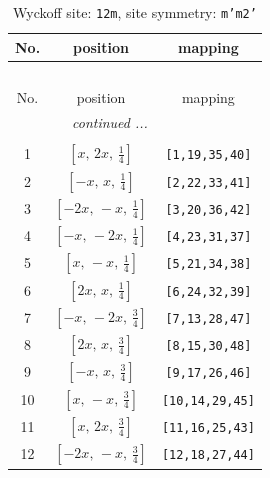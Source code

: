 \documentclass[fleqn,8pt]{jsarticle}
\begin{document}
\begin{longtable}{ccc}
\caption{Wyckoff site: {\tt 12m}, site symmetry: {\tt m'm2'}}
 \\
 \hline \hline
No. & position & mapping \\ \hline \endfirsthead

\multicolumn{2}{l}{\tablename\ \thetable{}} \\
 \hline \hline
No. & position & mapping \\ \hline \endhead

 \hline \hline
\multicolumn{2}{r}{\footnotesize\it continued ...} \\ \endfoot

 \hline \hline
\multicolumn{2}{r}{} \\ \endlastfoot

1 & $\left[ x,\, 2 x,\, \frac{1}{4} \right]$ & {\tt [1,19,35,40]} \\ \hline
2 & $\left[ - x,\, x,\, \frac{1}{4} \right]$ & {\tt [2,22,33,41]} \\ \hline
3 & $\left[ - 2 x,\, - x,\, \frac{1}{4} \right]$ & {\tt [3,20,36,42]} \\ \hline
4 & $\left[ - x,\, - 2 x,\, \frac{1}{4} \right]$ & {\tt [4,23,31,37]} \\ \hline
5 & $\left[ x,\, - x,\, \frac{1}{4} \right]$ & {\tt [5,21,34,38]} \\ \hline
6 & $\left[ 2 x,\, x,\, \frac{1}{4} \right]$ & {\tt [6,24,32,39]} \\ \hline
7 & $\left[ - x,\, - 2 x,\, \frac{3}{4} \right]$ & {\tt [7,13,28,47]} \\ \hline
8 & $\left[ 2 x,\, x,\, \frac{3}{4} \right]$ & {\tt [8,15,30,48]} \\ \hline
9 & $\left[ - x,\, x,\, \frac{3}{4} \right]$ & {\tt [9,17,26,46]} \\ \hline
10 & $\left[ x,\, - x,\, \frac{3}{4} \right]$ & {\tt [10,14,29,45]} \\ \hline
11 & $\left[ x,\, 2 x,\, \frac{3}{4} \right]$ & {\tt [11,16,25,43]} \\ \hline
12 & $\left[ - 2 x,\, - x,\, \frac{3}{4} \right]$ & {\tt [12,18,27,44]} \\
\end{longtable}
\renewcommand{\arraystretch}{1.2}
\end{document}
